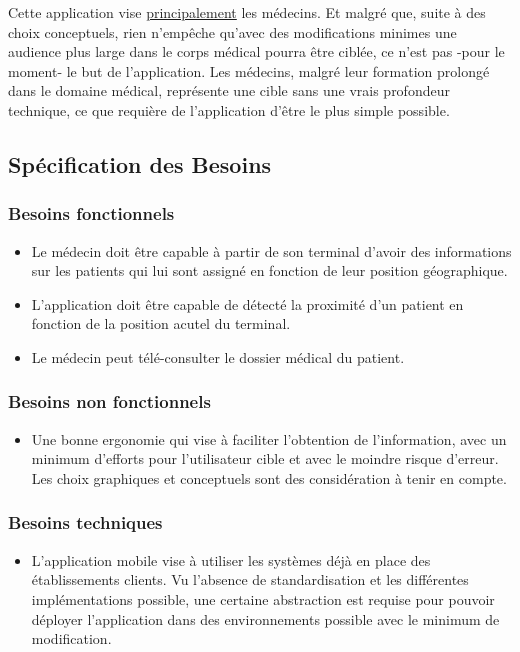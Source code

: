 Cette application vise \underline{principalement} les médecins. Et
malgré que, suite à des choix conceptuels, rien n’empêche qu’avec des
modifications minimes une audience plus large dans le corps médical
pourra être ciblée, ce n’est pas -pour le moment- le but de
l’application. Les médecins, malgré leur formation prolongé dans le
domaine médical, représente une cible sans une vrais profondeur
technique, ce que requière de l’application d’être le plus simple
possible.

\subsection{Spécification des Besoins}
\subsubsection{Besoins fonctionnels}
\begin{itemize}
\item Le médecin doit être capable à partir de son terminal d’avoir des informations sur les patients qui lui sont assigné en fonction de leur position géographique.

\item L'application doit être capable de détecté la proximité d'un
patient en fonction de la position acutel du terminal.

\item Le médecin peut télé-consulter le dossier médical du patient.


\end{itemize}

\subsubsection{Besoins non fonctionnels}
\begin{itemize}

\item Une bonne ergonomie qui vise à faciliter l'obtention de
l'information, avec un minimum d'efforts pour l'utilisateur cible et
avec le moindre risque d'erreur. Les choix graphiques et conceptuels
sont des considération à tenir en compte.

\end{itemize}

\subsubsection{Besoins techniques}
\begin{itemize}

\item L’application mobile vise à utiliser les systèmes déjà en place des établissements clients. Vu l’absence de standardisation et les différentes implémentations possible, une certaine abstraction est requise pour pouvoir déployer l’application dans des environnements possible avec le minimum de modification.

\end{itemize}


